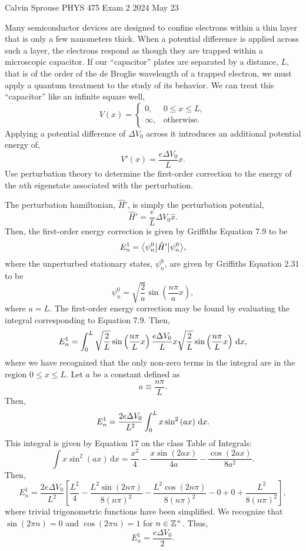 \documentclass[a4paper, 12pt]{config/homework}
\begin{document}
\noindent
Calvin Sprouse \hfill PHYS 475 Exam 2 \hfill 2024 May 23
\bigskip

\noindent
Many semiconductor devices are designed to confine electrons within a thin layer that is only a few nanometers thick. When a potential difference is applied across such a layer, the electrons respond as though they are trapped within a microscopic capacitor. If our ``capacitor'' plates are separated by a distance, \(L\), that is of the order of the de Broglie wavelength of a trapped electron, we must apply a quantum treatment to the study of its behavior. We can treat this ``capacitor'' like an infinite square well,
\[V(x) = \begin{cases}
0, & 0 \le x \le L, \\
\infty, & \text{otherwise}.
\end{cases}\]
Applying a potential difference of \(\Delta V_0\) across it introduces an additional potential energy of,
\[V'(x) = \frac{e\Delta V_0}{L}x.\]
Use perturbation theory to determine the first-order correction to the energy of the \(n\)th eigenstate associated with the perturbation.

\bigskip\noindent
The perturbation hamiltonian, \(\hat{H}'\), is simply the perturbation potential,
\[\hat{H}' = \frac{e}{L}\Delta V_0 \hat{x}.\]
Then, the first-order energy correction is given by Griffiths Equation 7.9 to be
\[E_n^1 = \bra*{\psi^0_n}\hat{H}'\ket*{\psi^0_n},\]
where the unperturbed stationary states, \(\psi_n^0\), are given by Griffiths Equation 2.31 to be
\[\psi_n^0 = \sqrt{\frac{2}{a}}\sin\left(\frac{n\pi}{a}x\right),\]
where \(a=L\). The first-order energy correction may be found by evaluating the integral corresponding to Equation 7.9. Then,
\[E_n^1 = \int_{0}^{L}{\sqrt{\frac{2}{L}}\sin\left(\frac{n\pi}{L}x\right) \frac{e\Delta V_0}{L}x \sqrt{\frac{2}{L}}\sin\left(\frac{n\pi}{L}x\right)\,\text{d}x},\]
where we have recognized that the only non-zero terms in the integral are in the region \(0\le x \le L\). Let \(a\) be a constant defined as
\[a \equiv \frac{n\pi}{L}.\]
Then,
\[E_n^1 = \frac{2e\Delta V_0}{L^2} \int_{0}^{L}{x\sin^2\left(ax\right)\,\text{d}x}.\]
This integral is given by Equation 17 on the class Table of Integrals:
\[\int{x\sin^2\left(ax\right)\,\text{d}x} = \frac{x^2}{4} - \frac{x\sin(2ax)}{4a} - \frac{\cos(2ax)}{8a^2}.\]
Then,
\[E_n^1 = \frac{2e\Delta V_0}{L^2} \left[
\frac{L^2}{4} - \frac{L^2\sin\left(2n\pi\right)}{8(n\pi)^2} - \frac{L^2\cos\left(2n\pi\right)}{8(n\pi)^2} - 0 + 0 + \frac{L^2}{8\left(n\pi\right)^2}
\right],\]
where trivial trigonometric functions have been simplified. We recognize that \\ \(\sin(2\pi n) = 0\) and \(\cos(2\pi n) = 1\) for \(n\in\mathbb{Z}^+\). Thus,
\[E_n^1 = \frac{e\Delta V_0}{2}.\]
\end{document}
